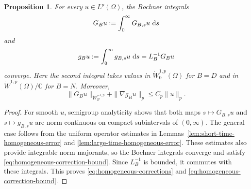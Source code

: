 \documentclass[12pt]{amsart}
\newcommand\dd{\,{\rm d}}
\newtheorem{proposition}[theorem]{Proposition}
\theoremstyle{remark}
\begin{document}

\begin{proposition}
\label{prop:integrated-homogeneous-error}
For every \(u\in L^p(\Omega)\), the Bochner integrals
\begin{equation}\label{eq:integrated-form-error}
 G_Bu:=\int_0^\infty G_{B,s}u\,\dd s
\end{equation}
and
\begin{equation}\label{eq:homogeneous-corrections}
 g_Bu:=\int_0^\infty g_{B,s}u\,\dd s
      =L_B^{-1}G_Bu
\end{equation}
converge.  Here the second integral takes values in
\(\dot W^{1,p}_0(\Omega)\) for \(B=D\) and in
\(\dot W^{1,p}(\Omega)/\mathbb C\) for \(B=N\).  Moreover,
\begin{equation}\label{eq:homogeneous-correction-bound}
 \|G_Bu\|_{\dot W^{-1,p}_B}+\|\nabla g_Bu\|_p
 \leq C_p\|u\|_p.
\end{equation}
\end{proposition}

\begin{proof}
For smooth \(u\), semigroup analyticity shows that both maps $s\longmapsto G_{B,s}u$ and $s\longmapsto g_{B,s}u$ are
norm-continuous on compact subintervals of \((0,\infty)\).  The general
case follows from the uniform operator estimates in
Lemmas~\ref{lem:short-time-homogeneous-error} and
\ref{lem:large-time-homogeneous-error}.  These estimates also provide
integrable norm majorants, so the Bochner integrals converge and satisfy
\eqref{eq:homogeneous-correction-bound}.  Since \(L_B^{-1}\) is bounded,
it commutes with these integrals. This proves \eqref{eq:homogeneous-corrections} and
\eqref{eq:homogeneous-correction-bound}.
\end{proof}
\end{document}
